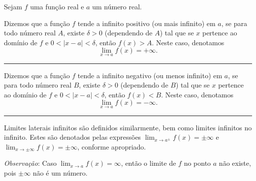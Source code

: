 \begin{definition}
	Sejam $f$ uma função real e $a$ um número real.

	Dizemos que a função $f$ tende a infinito positivo (ou mais infinito) em $a$, se para todo número real $A$, existe $\delta>0$ (dependendo de $A$) tal que se $x$ pertence ao domínio de $f$ e $0<|x-a|<\delta$, então $f(x)>A$. Neste caso, denotamos
	\[\lim_{x\to a}f(x)=+\infty.\]
	
	\hrule

	Dizemos que a função $f$ tende a infinito negativo (ou menos infinito) em $a$, se para todo número real $B$, existe $\delta>0$ (dependendo de $B$) tal que se $x$ pertence ao domínio de $f$ e $0<|x-a|<\delta$, então $f(x)<B$. Neste caso, denotamos
	\[\lim_{x\to a}f(x)=-\infty.\]
	
	\hrule

	Limites laterais infinitos são definidos similarmente, bem como limites infinitos no infinito. Estes são denotados pelas expressões $\displaystyle \lim_{x\to a^\pm}f(x)=\pm\infty$ e $\displaystyle \lim_{x\to\pm\infty}f(x)=\pm\infty$, conforme apropriado.
\end{definition}

\textit{Observação}: Caso $\lim_{x\to a}f(x)=\infty$, então o limite de $f$ no ponto $a$ não existe, pois $\pm\infty$ não é um número.